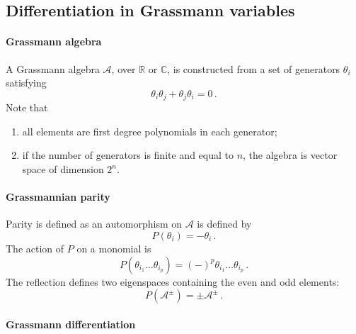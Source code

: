 \documentclass[notes]{subfiles}
\begin{document}
\begin{subappendices}
  
\section{Differentiation in Grassmann variables}
\label{sec:diff-grassm-vari}

\paragraph{Grassmann algebra}

A Grassmann algebra $\mathcal{A}$, over $\mathbb{R}$ or $\mathbb{C}$,
is constructed from a set of generators $\theta_i$ satisfying
\begin{equation}
  \label{eq:AntiCommGen}
  \theta_i \theta_j + \theta_j \theta_i = 0\, .
\end{equation}
Note that 
\begin{enumerate}
\item all elements are first degree polynomials in each generator; 
\item if the number of generators is finite and equal to $n$, the
  algebra is vector space of dimension $2^n$.
\end{enumerate}

\paragraph{Grassmannian parity}

Parity is defined as an automorphism on $\mathcal{A}$ is defined by
\begin{equation}
  \label{eq:GrassParity}
  P(\theta_i) = - \theta_i\, .
\end{equation}
The action of $P$ on a monomial is
\begin{equation}
  \label{eq:GrassParMon}
  P(\theta_{i_1} \ldots \theta_{i_p}) = (-)^p \theta_{i_1} \ldots
  \theta_{i_p}\, .
\end{equation}
The reflection defines two eigenspaces containing the even and odd
elements:
\begin{equation}
  \label{eq:ParitySubspaces}
  P(\mathcal{A}^\pm) = \pm \mathcal{A}^\pm\, .
\end{equation}

\paragraph{Grassmann differentiation}


\end{subappendices}
\end{document}

